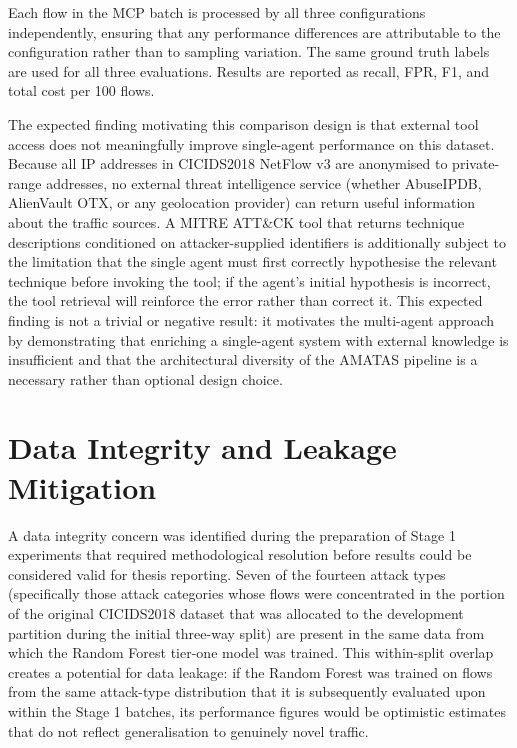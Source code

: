 Each flow in the MCP batch is processed by all three configurations independently, ensuring that any performance differences are attributable to the configuration rather than to sampling variation. The same ground truth labels are used for all three evaluations. Results are reported as recall, FPR, F1, and total cost per 100 flows.

The expected finding motivating this comparison design is that external tool access does not meaningfully improve single-agent performance on this dataset. Because all IP addresses in CICIDS2018 NetFlow v3 are anonymised to private-range addresses, no external threat intelligence service (whether AbuseIPDB, AlienVault OTX, or any geolocation provider) can return useful information about the traffic sources. A MITRE ATT\&CK tool that returns technique descriptions conditioned on attacker-supplied identifiers is additionally subject to the limitation that the single agent must first correctly hypothesise the relevant technique before invoking the tool; if the agent's initial hypothesis is incorrect, the tool retrieval will reinforce the error rather than correct it. This expected finding is not a trivial or negative result: it motivates the multi-agent approach by demonstrating that enriching a single-agent system with external knowledge is insufficient and that the architectural diversity of the AMATAS pipeline is a necessary rather than optional design choice.

\section{Data Integrity and Leakage Mitigation}
\label{sec:data-integrity}

A data integrity concern was identified during the preparation of Stage 1 experiments that required methodological resolution before results could be considered valid for thesis reporting. Seven of the fourteen attack types (specifically those attack categories whose flows were concentrated in the portion of the original CICIDS2018 dataset that was allocated to the development partition during the initial three-way split) are present in the same data from which the Random Forest tier-one model was trained. This within-split overlap creates a potential for data leakage: if the Random Forest was trained on flows from the same attack-type distribution that it is subsequently evaluated upon within the Stage 1 batches, its performance figures would be optimistic estimates that do not reflect generalisation to genuinely novel traffic.

